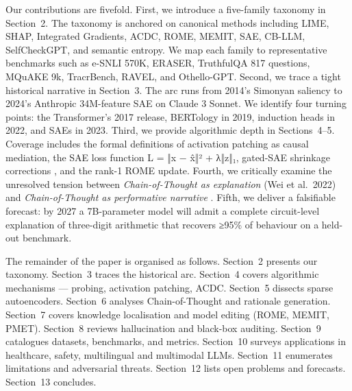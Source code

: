 \documentclass{article}
\begin{document}
Our contributions are fivefold. First, we introduce a five-family taxonomy in Section~2. The taxonomy is anchored on canonical methods including LIME, SHAP, Integrated Gradients, ACDC, ROME, MEMIT, SAE, CB-LLM, SelfCheckGPT, and semantic entropy. We map each family to representative benchmarks such as e-SNLI 570K, ERASER, TruthfulQA 817 questions, MQuAKE 9k, TracrBench, RAVEL, and Othello-GPT. Second, we trace a tight historical narrative in Section~3. The arc runs from 2014's Simonyan saliency to 2024's Anthropic 34M-feature SAE on Claude 3 Sonnet. We identify four turning points: the Transformer's 2017 release, BERTology in 2019, induction heads in 2022, and SAEs in 2023. Third, we provide algorithmic depth in Sections~4--5. Coverage includes the formal definitions of activation patching as causal mediation, the SAE loss function L = ‖x − x̂‖² + λ‖z‖₁, gated-SAE shrinkage corrections \citep{rajamanoharan2024improvingdictionar}, and the rank-1 ROME update. Fourth, we critically examine the unresolved tension between \emph{Chain-of-Thought as explanation} (Wei et al.~2022) and \emph{Chain-of-Thought as performative narrative} \citep{turpin2023languagemodelsdont}. Fifth, we deliver a falsifiable forecast: by 2027 a 7B-parameter model will admit a complete circuit-level explanation of three-digit arithmetic that recovers ≥95\% of behaviour on a held-out benchmark.

The remainder of the paper is organised as follows. Section~2 presents our taxonomy. Section~3 traces the historical arc. Section~4 covers algorithmic mechanisms --- probing, activation patching, ACDC. Section~5 dissects sparse autoencoders. Section~6 analyses Chain-of-Thought and rationale generation. Section~7 covers knowledge localisation and model editing (ROME, MEMIT, PMET). Section~8 reviews hallucination and black-box auditing. Section~9 catalogues datasets, benchmarks, and metrics. Section~10 surveys applications in healthcare, safety, multilingual and multimodal LLMs. Section~11 enumerates limitations and adversarial threats. Section~12 lists open problems and forecasts. Section~13 concludes.
\end{document}
